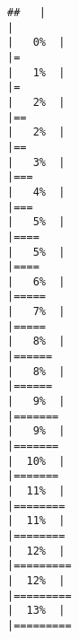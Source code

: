 \documentclass[
]{article}
\begin{document}
\begin{verbatim}
##   |                                                                              |                                                                      |   0%  |                                                                              |=                                                                     |   1%  |                                                                              |=                                                                     |   2%  |                                                                              |==                                                                    |   2%  |                                                                              |==                                                                    |   3%  |                                                                              |===                                                                   |   4%  |                                                                              |===                                                                   |   5%  |                                                                              |====                                                                  |   5%  |                                                                              |====                                                                  |   6%  |                                                                              |=====                                                                 |   7%  |                                                                              |=====                                                                 |   8%  |                                                                              |======                                                                |   8%  |                                                                              |======                                                                |   9%  |                                                                              |=======                                                               |   9%  |                                                                              |=======                                                               |  10%  |                                                                              |=======                                                               |  11%  |                                                                              |========                                                              |  11%  |                                                                              |========                                                              |  12%  |                                                                              |=========                                                             |  12%  |                                                                              |=========                                                             |  13%  |                                                                              |========= 
\end{verbatim}
\end{document}
